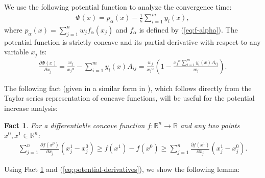 \documentclass[11pt]{article}
\newtheorem{fact}[theorem]{Fact}
\begin{document}
We use the following potential function to analyze the convergence time:
\begin{align*}
\Phi(x) = p_\alpha(x) - \frac{1}{\kappa}\sum_{i=1}^m y_i(x),
\end{align*}
where $p_\alpha(x) = \sum_{j=1}^n w_jf_{\alpha}({x_j})$ and $f_\alpha$ is defined by (\ref{eq:f-alpha}).
The potential function is strictly concave and its partial derivative with respect to any variable $x_j$ is:
\begin{align}
\frac{\partial \Phi(x)}{\partial x_j} = \frac{w_j}{{x_j}^{\alpha}}-\sum_{i=1}^m y_i(x)A_{ij}
= \frac{w_j}{{x_j}^{\alpha}}\left(1 - \frac{{x_j}^{\alpha}\sum_{i=1}^my_i(x)A_{ij}}{w_j}\right).\label{eq:potential-derivatives}
\end{align}

The following fact (given in a similar form in \cite{AwerbuchKhandekar2009}), which follows directly from the Taylor series representation of concave functions, will be useful for the potential increase analysis:
\begin{fact}\label{fact:taylor}
For a differentiable concave function $f:\mathbb{R}^n\rightarrow\mathbb{R}$ and any two points $x^0, x^1 \in \mathbb{R}^n$:
\begin{align*}
\sum_{j=1}^n \frac{\partial f(x^0)}{\partial x_j}(x_j^1-x_j^0)\geq f(x^1)-f(x^0)\geq \sum_{j=1}^n \frac{\partial f(x^1)}{\partial x_j}(x_j^1-x_j^0).
\end{align*}
\end{fact}

Using Fact \ref{fact:taylor} and (\ref{eq:potential-derivatives}), we show the following lemma:
\end{document}
